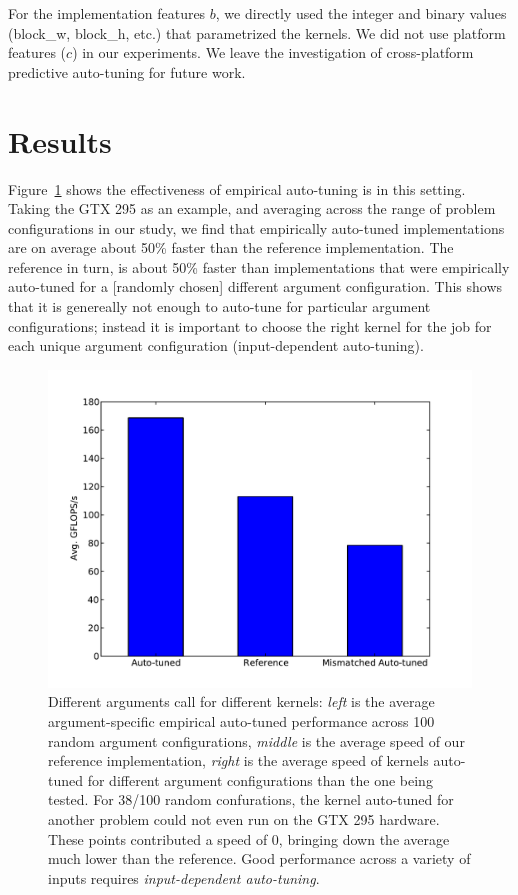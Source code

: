 \documentclass{sig-alternate}
\begin{document}
For the implementation features $b$, we directly used the integer and binary values (block\_w, block\_h, etc.) that parametrized the kernels.
We did not use platform features ($c$) in our experiments. We leave the investigation
of cross-platform predictive auto-tuning for future work.


\section{Results}

Figure~\ref{fig:allstars} shows the effectiveness of empirical auto-tuning is in this setting.
Taking the GTX 295 as an example,
and averaging across the range of problem configurations in our study,
we find that empirically auto-tuned implementations are on average about
50\% faster than the reference implementation.
The reference in turn, is about 50\% faster than implementations that were empirically auto-tuned for a [randomly chosen] different argument configuration.
This shows that it is genereally not enough to auto-tune for particular argument configurations;
instead it is important to choose the right kernel for the job for each unique argument configuration (input-dependent auto-tuning).
\begin{figure}
\centering
\includegraphics[scale=.42]{allstars_mixup_295.pdf}
\caption{Different arguments call for different kernels:
{\em left} is the average argument-specific empirical auto-tuned performance across 100 random argument configurations,
{\em middle} is the average speed of our reference implementation,
{\em right} is the average speed of kernels auto-tuned for different argument configurations than the one being tested.
For 38/100 random confurations, the kernel auto-tuned for another problem could not even run on the GTX 295 hardware.
These points contributed a speed of 0, bringing down the average much lower than the reference.
Good performance across a variety of inputs requires {\em input-dependent auto-tuning}.
}
\label{fig:allstars}
\end{figure}
\end{document}
